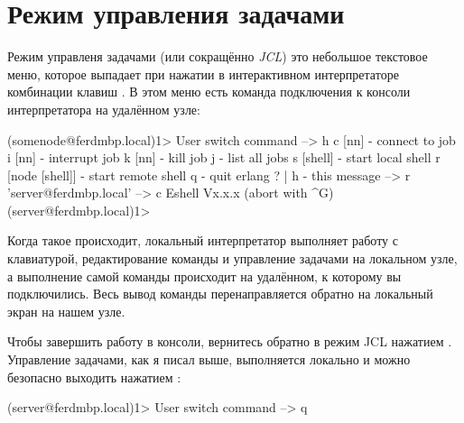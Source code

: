 \section{Режим управления задачами}
\newcommand{\Circum}{$ ^{\wedge}$}

Режим управленя задачами (или сокращённо \emph{JCL}) это небольшое текстовое меню, которое выпадает при нажатии в интерактивном интерпретаторе комбинации клавиш \command{\Circum{}G}. В этом меню есть команда подключения к консоли интерпретатора на удалённом узле:

\begin{VerbatimEshell}
(somenode@ferdmbp.local)1>
User switch command
 --> h
  c [nn]            - connect to job
  i [nn]            - interrupt job
  k [nn]            - kill job
  j                 - list all jobs
  s [shell]         - start local shell
  r [node [shell]]  - start remote shell
  q                 - quit erlang
  ? | h             - this message
 --> r 'server@ferdmbp.local'
 --> c
Eshell Vx.x.x  (abort with ^G)
(server@ferdmbp.local)1>
\end{VerbatimEshell}

Когда такое происходит, локальный интерпретатор выполняет работу с клавиатурой, редактирование команды и управление задачами на локальном узле, а выполнение самой команды происходит на удалённом, к которому вы подключились. Весь вывод команды перенаправляется обратно на локальный экран на нашем узле.

Чтобы завершить работу в консоли, вернитесь обратно в режим JCL нажатием \command{\Circum{}G}. Управление задачами, как я писал выше, выполняется локально и можно безопасно выходить нажатием \command{\Circum{}G q}:

\begin{VerbatimEshell}
(server@ferdmbp.local)1>
User switch command
 --> q
\end{VerbatimEshell}

